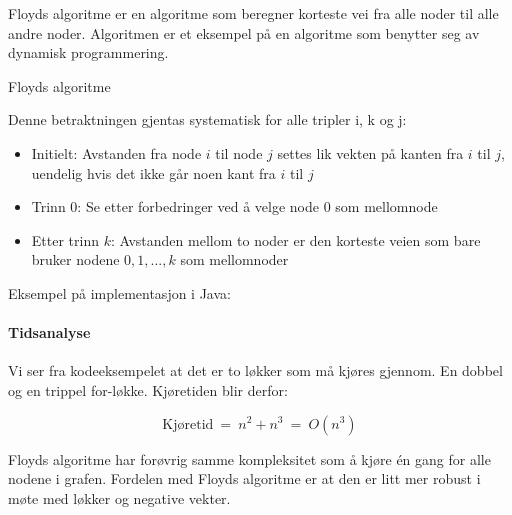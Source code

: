 Floyds algoritme er en algoritme som beregner korteste vei fra alle noder til alle andre noder. Algoritmen er et eksempel på en algoritme som benytter seg av dynamisk programmering. 

\begin{theorem} Floyds algoritme

Denne betraktningen gjentas systematisk for alle tripler i, k og j:
\begin{itemize}
\item Initielt: Avstanden fra node $ i $ til node $ j $ settes lik vekten på kanten fra $ i $ til $ j $, uendelig hvis det ikke går noen kant fra $ i $ til $ j $
\item Trinn 0: Se etter forbedringer ved å velge node 0 som mellomnode
\item Etter trinn $ k $: Avstanden mellom to noder er den korteste veien som bare bruker nodene $ 0, 1, ... , k $ som mellomnoder
\end{itemize}
\end{theorem}

\noindent Eksempel på implementasjon i Java:

\paragraph{Tidsanalyse}
Vi ser fra kodeeksempelet at det er to løkker som må kjøres gjennom. En dobbel og en trippel for-løkke. Kjøretiden blir derfor:

\[ \text{Kjøretid} ~=~ n^2 + n^3  ~=~ O\left(n^3\right) \]

\noindent Floyds algoritme har forøvrig samme kompleksitet som å kjøre  én gang for alle nodene i grafen. Fordelen med Floyds algoritme er at den er litt mer robust i møte med løkker og negative vekter. 


